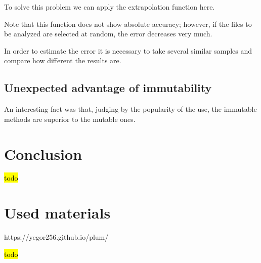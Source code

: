 \documentclass[anonymous,sigplan,review,11pt,nonacm,natbib=false]{acmart}
\begin{document}
    To solve this problem we can apply the extrapolation function here.

    Note that this function does not show absolute accuracy; however, if the files to be analyzed are selected at random, the error decreases very much.

    In order to estimate the error it is necessary to take several similar samples and compare how different the results are.

    \subsection{Unexpected advantage of immutability}

    An interesting fact was that, judging by the popularity of the use, the immutable methods are superior to the mutable ones.

    \section{Conclusion}\label{sec:conclusion}

    \hl{todo}

    \section{Used materials}

    https://yegor256.github.io/plum/

    \hl{todo}

    \printbibliography
\end{document}
